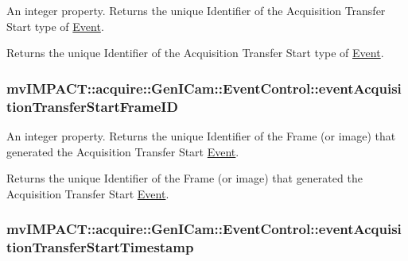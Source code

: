 An integer property. Returns the unique Identifier of the Acquisition Transfer Start type of \hyperlink{classmv_i_m_p_a_c_t_1_1acquire_1_1_event}{Event}. 

Returns the unique Identifier of the Acquisition Transfer Start type of \hyperlink{classmv_i_m_p_a_c_t_1_1acquire_1_1_event}{Event}. \hypertarget{classmv_i_m_p_a_c_t_1_1acquire_1_1_gen_i_cam_1_1_event_control_ac3678d0a09d19a23b0cb8636a1afb372}{
\subsubsection[{event\+Acquisition\+Transfer\+Start\+Frame\+I\+D}]{ mv\+I\+M\+P\+A\+C\+T\+::acquire\+::\+Gen\+I\+Cam\+::\+Event\+Control\+::event\+Acquisition\+Transfer\+Start\+Frame\+I\+D}}\label{classmv_i_m_p_a_c_t_1_1acquire_1_1_gen_i_cam_1_1_event_control_ac3678d0a09d19a23b0cb8636a1afb372}


An integer property. Returns the unique Identifier of the Frame (or image) that generated the Acquisition Transfer Start \hyperlink{classmv_i_m_p_a_c_t_1_1acquire_1_1_event}{Event}. 

Returns the unique Identifier of the Frame (or image) that generated the Acquisition Transfer Start \hyperlink{classmv_i_m_p_a_c_t_1_1acquire_1_1_event}{Event}. \hypertarget{classmv_i_m_p_a_c_t_1_1acquire_1_1_gen_i_cam_1_1_event_control_a7cf72a7244fc03351fa12d6504fc9610}{
\subsubsection[{event\+Acquisition\+Transfer\+Start\+Timestamp}]{ mv\+I\+M\+P\+A\+C\+T\+::acquire\+::\+Gen\+I\+Cam\+::\+Event\+Control\+::event\+Acquisition\+Transfer\+Start\+Timestamp}}\label{classmv_i_m_p_a_c_t_1_1acquire_1_1_gen_i_cam_1_1_event_control_a7cf72a7244fc03351fa12d6504fc9610}


